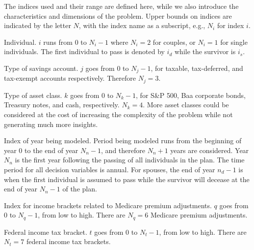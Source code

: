 \documentclass{report}[fleqn,11pt]
\begin{document}
The indices used and their range are defined here, while we also
introduce the characteristics and dimensions of the problem.
Upper bounds on indices are indicated by the letter $N$, with the
index name as a subscript, e.g., $N_i$ for index $i$.
\begin{description}[leftmargin=4em,style=multiline]
\item [$i$]
	Individual. $i$ runs from 0 to $N_i - 1$ where $N_i = 2$ for couples,
	or $N_i= 1$ for single individuals. The first individual to pass
		is denoted by $i_d$ while the survivor is $i_s$.
\item [$j$]
	Type of savings account. $j$ goes from 0 to $N_j - 1$, for taxable, tax-deferred,
	and tax-exempt accounts respectively. Therefore $N_j = 3$.
\item[$k$]
	Type of asset class. $k$ goes from 0 to $N_k -1 $, for S\&P 500,
	Baa corporate bonds, Treasury notes, and cash, respectively. $N_k = 4$.
	More asset classes could be considered at the cost of increasing
	the complexity of the problem while not generating much more insights.
\item [$n$]
	Index of year being modeled. Period being modeled runs from the beginning of year 0 to 
	the end of year $N_n-1$, and therefore $N_n + 1$ years are considered.
	Year $N_n$ is the first year following the passing of all
	individuals in the plan. The time period for all decision variables is annual.
	For spouses, the end of year $n_d-1$ is when the first individual is assumed to pass while
	the survivor will decease at the end of year $N_n-1$ of the plan.
\item [$q$]
	Index for income brackets related to Medicare premium adjustments.
	$q$ goes from 0 to $N_q - 1$, from low to high.
	There are $N_q = 6$ Medicare premium adjustments.
\item [$t$]
	Federal income tax bracket. $t$ goes from 0 to $N_t - 1$, from low to high.
	There are $N_t = 7$ federal income tax brackets.
\end{description}
\end{document}
